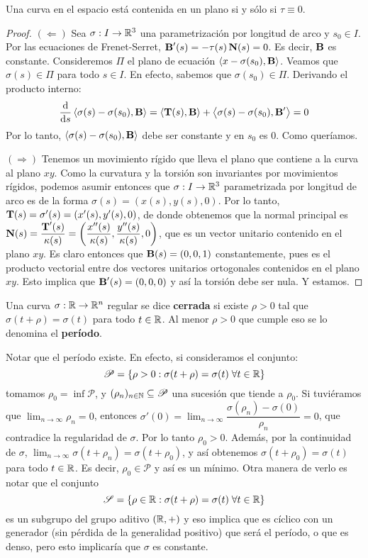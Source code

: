 \begin{prop}
Una curva en el espacio está contenida en un plano si y sólo si $\tau\equiv 0$.
\begin{proof}
\hfill

$(\Longleftarrow)$ Sea $\sigma:I\to\mathbb{R}^3$ una parametrización por longitud de arco y $s_0\in I$. Por las ecuaciones de Frenet-Serret, $\operatorname{\mathbf{B}}'(s)=-\tau(s)\operatorname{\mathbf{N}}(s)=0$. Es decir, $\operatorname{\mathbf{B}}$ es constante. Consideremos $\Pi$ el plano de ecuación $\left\langle x-\sigma(s_0),\operatorname{\mathbf{B}} \right\rangle$. Veamos que $\sigma(s)\in\Pi$ para todo $s\in I$. En efecto, sabemos que $\sigma(s_0)\in\Pi$. Derivando el producto interno: $$\dfrac{\mathop{}\!\mathrm{d}}{\mathop{}\!\mathrm{d} s}\left\langle \sigma(s)-\sigma(s_0),\operatorname{\mathbf{B}} \right\rangle = \left\langle \operatorname{\mathbf{T}}(s),\operatorname{\mathbf{B}} \right\rangle + \left\langle \sigma(s)-\sigma(s_0),\operatorname{\mathbf{B}}' \right\rangle = 0$$ Por lo tanto, $\left\langle \sigma(s)-\sigma(s_0),\operatorname{\mathbf{B}} \right\rangle$ debe ser constante y en $s_0$ es $0$. Como queríamos.

$(\Longrightarrow)$ Tenemos un movimiento rígido que lleva el plano que contiene a la curva al plano $xy$. Como la curvatura y la torsión son invariantes por movimientos rígidos, podemos asumir entonces que $\sigma:I\to\mathbb{R}^3$ parametrizada por longitud de arco es de la forma $\sigma(s)=(x(s),y(s),0)$. Por lo tanto, $\operatorname{\mathbf{T}}(s)=\sigma'(s)=(x'(s),y'(s),0)$, de donde obtenemos que la normal principal es $\operatorname{\mathbf{N}}(s)=\dfrac{\operatorname{\mathbf{T}}'(s)}{\kappa(s)}=\left(\dfrac{x''(s)}{\kappa(s)},\dfrac{y''(s)}{\kappa(s)},0\right)$, que es un vector unitario contenido en el plano $xy$. Es claro entonces que $\operatorname{\mathbf{B}}(s) = (0,0,1)$ constantemente, pues es el producto vectorial entre dos vectores unitarios ortogonales contenidos en el plano $xy$. Esto implica que $\operatorname{\mathbf{B}}'(s)=(0,0,0)$ y así la torsión debe ser nula. Y estamos.
\end{proof}
\end{prop}

\begin{defn}
Una curva $\sigma:\mathbb{R}\to\mathbb{R}^n$ regular se dice \textbf{cerrada} si existe $\rho>0$ tal que $\sigma(t+\rho)=\sigma(t)$ para todo $t\in\mathbb{R}$. Al menor $\rho>0$ que cumple eso se lo denomina el \textbf{período}.
\end{defn}

\begin{obs}
Notar que el período existe. En efecto, si consideramos el conjunto: $$\mathscr{P}=\{\rho>0:\sigma(t+\rho)=\sigma(t)\;\forall t\in\mathbb{R}\}$$ tomamos $\rho_0=\inf\mathscr{P}$, y $(\rho_n)_{n\in\mathbb{N}}\subseteq\mathscr{P}$ una sucesión que tiende a $\rho_0$. Si tuviéramos que $\displaystyle\lim_{n\to\infty}\rho_n=0$, entonces $\sigma'(0)=\lim_{n\to\infty}\dfrac{\sigma(\rho_n)-\sigma(0)}{\rho_n} = 0$, que contradice la regularidad de $\sigma$. Por lo tanto $\rho_0>0$. Además, por la continuidad de $\sigma$, $\displaystyle\lim_{n\to\infty}\sigma(t+\rho_n)=\sigma(t+\rho_0)$, y así obtenemos $\sigma(t+\rho_0)=\sigma(t)$ para todo $t\in\mathbb{R}$. Es decir, $\rho_0\in\mathscr{P}$ y así es un mínimo. Otra manera de verlo es notar que el conjunto $$\mathscr{S}=\{\rho\in\mathbb{R}:\sigma(t+\rho)=\sigma(t)\;\forall t\in\mathbb{R}\}$$ es un subgrupo del grupo aditivo $(\mathbb{R},+)$ y eso implica que es cíclico con un generador (sin pérdida de la generalidad positivo) que será el período, o que es denso, pero esto implicaría que $\sigma$ es constante.
\end{obs}


